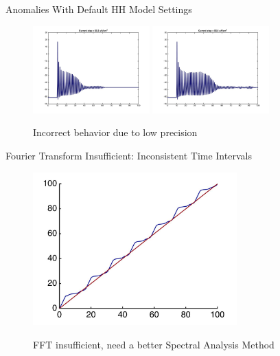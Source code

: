 \documentclass{beamer}
\begin{document}
\begin{frame}{Anomalies With Default HH Model Settings}
  \begin{figure}
    \centering
    \includegraphics[width = 0.4\textwidth]{./images/current55p5.jpg}
    \includegraphics[width = 0.4\textwidth]{./images/current55p6.jpg}

    Incorrect behavior due to low precision
  \end{figure}
\end{frame}

\begin{frame}{Fourier Transform Insufficient: Inconsistent Time Intervals}
  \begin{figure}
    \centering
    \includegraphics[width = 0.7\textwidth]{./images/lintimevsactualtime.jpg}

    FFT insufficient, need a better Spectral Analysis Method
  \end{figure}
\end{frame}
\end{document}
